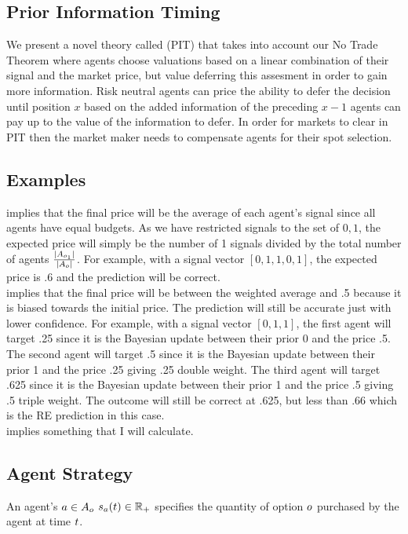 \subsection{Prior Information Timing}
We present a novel theory called  (PIT) that takes into account our No Trade
Theorem where agents choose valuations based on a linear combination of their signal and the market
price, but value deferring this assesment in order to gain more information. Risk neutral agents can
price the ability to defer the decision until position $x$ based on the added information of the 
preceding $x-1$ agents can pay up to the value of the information to defer. In order for markets
to clear in PIT then the market maker needs to compensate agents for their spot selection.\\

\subsection{Examples}
 implies that the final price will be the average of each agent's signal since all agents have equal budgets. As we have restricted signals to the set of ${0,1}$, the expected price will simply be the number of 1 signals divided by the total number of agents $\frac{|A_{o_1}|}{|A_o|}$.  For example, with a signal vector $\left[0,1,1,0,1\right]$, the expected price is .6 and the prediction will be correct. \\

 implies that the final price will be between the weighted average and .5 because it is biased towards the initial price. The prediction will still be accurate just with lower confidence. For example, with a signal vector $\left[0,1,1\right]$, the first agent will target .25 since it is the Bayesian update between their prior 0 and the price .5. The second agent will target .5 since it is the Bayesian update between their prior 1 and the price .25 giving .25 double weight. The third agent will target .625 since it is the Bayesian update between their prior 1 and the price .5 giving .5 triple weight. The outcome will still be correct at .625, but less than .66 which is the RE prediction in this case.\\

 implies something that I will calculate.\\

\subsection{Agent Strategy}
An agent's $a\in A_o$  
$s_a(t) \in \mathbb{R}_+$ specifies the quantity of option 
$o$ purchased by the agent at time $t$.\\

